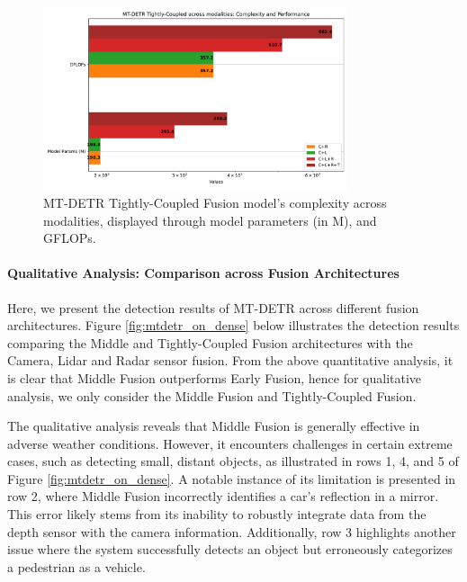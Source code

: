 \documentclass[report.tex]{subfiles}
\begin{document}
    \begin{figure}[h!]
        \centering
        \includegraphics[width=0.8\textwidth]{images/results/mtdetr/T_CLRT/model_complexity.pdf}
        \caption{MT-DETR Tightly-Coupled Fusion model's complexity across modalities, displayed through model parameters (in M), and GFLOPs.}
        \label{fig:mtdetr_t_clrt_model_complexity}
    \end{figure}

    \paragraph*{Qualitative Analysis: Comparison across Fusion Architectures}

    Here, we present the detection results of MT-DETR across different fusion architectures. Figure \ref{fig:mtdetr_on_dense} below illustrates the detection results comparing the Middle and Tightly-Coupled Fusion architectures with the Camera, Lidar and Radar sensor fusion. From the above quantitative analysis, it is clear that Middle Fusion outperforms Early Fusion, hence for qualitative analysis, we only consider the Middle Fusion and Tightly-Coupled Fusion.

    The qualitative analysis reveals that Middle Fusion is generally effective in adverse weather conditions. However, it encounters challenges in certain extreme cases, such as detecting small, distant objects, as illustrated in rows 1, 4, and 5 of Figure \ref{fig:mtdetr_on_dense}. A notable instance of its limitation is presented in row 2, where Middle Fusion incorrectly identifies a car's reflection in a mirror. This error likely stems from its inability to robustly integrate data from the depth sensor with the camera information. Additionally, row 3 highlights another issue where the system successfully detects an object but erroneously categorizes a pedestrian as a vehicle.
\end{document}
